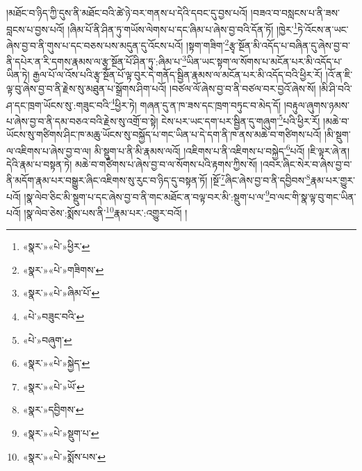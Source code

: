 །མཐོང་བ་ཉིད་ཀྱི་དུས་ནི་མཐོང་བའི་ཚེ་ཉེ་བར་གནས་པ་དེའི་དབང་དུ་བྱས་པའོ། །བཟའ་བ་བསླངས་པ་ནི་ཟས་བླངས་པ་བྱས་པའོ། །ཞིམ་པོ་ནི་ཤིན་ཏུ་གཡོས་ལེགས་པ་དང་ཞིམ་པ་ཞེས་བྱ་བའི་དོན་ཏོ། །ཁྱེར་\footnote{«སྣར་»«པེ་»ཕྱིར་}ཏེ་འོངས་ན་ཡང་ཞེས་བྱ་བ་ནི་གུས་པ་དང་བཅས་པས་མདུན་དུ་འོངས་པའོ། །སྟག་གཟིག་\footnote{«སྣར་»«པེ་»གཟིགས་}རྩྭ་སྔོན་མི་འདོད་པ་བཞིན་དུ་ཞེས་བྱ་བ་ནི་དཔེར་ན་རི་དགས་རྣམས་ལ་རྩྭ་སྔོན་པོ་ཤིན་ཏུ་:ཞིམ་པ་\footnote{«སྣར་»«པེ་»ཞིམ་པོ་}ཡིན་ཡང་སྟག་ལ་སོགས་པ་མངོན་པར་མི་འདོད་པ་ཡིན་ཏེ། རྒྱལ་པོ་ལ་འོས་པའི་རྩྭ་སྔོན་པོ་ལྟ་བུར་དེ་གནོད་སྦྱིན་རྣམས་ལ་མངོན་པར་མི་འདོད་བའི་ཕྱིར་རོ། །འོ་ན་ཇི་ལྟ་བུ་ཞེས་བྱ་བ་ནི་རྗེས་སུ་མཐུན་པ་སྒྲོགས་ཤིག་པའོ། །བཙལ་ལོ་ཞེས་བྱ་བ་ནི་བཙལ་བར་བྱའོ་ཞེས་སོ། །མི་ཤི་བའི་ཤ་དང་ཁྲག་ཡོངས་སུ་:གཟུང་བའི་\footnote{«པེ་»བཟུང་བའི་}ཕྱིར་ཏེ། གཞན་དུ་ན་ཁ་ཟས་དང་ཁྲག་བཏུང་བ་མེད་དོ། །བརྟུལ་ཞུགས་ཉམས་པ་ཞེས་བྱ་བ་ནི་དམ་བཅའ་བའི་རྗེས་སུ་འགྲོ་བ་སྟེ། ངེས་པར་ཡང་དག་པར་སྦྱིན་དུ་གཞུག་\footnote{«པེ་»བཞུག་}པའི་ཕྱིར་རོ། །མཆེ་བ་ཡོངས་སུ་གཙིགས་ཤིང་ཁ་མཆུ་ཡོངས་སུ་བསྐྱོད་པ་གང་ཡིན་པ་དེ་དག་ནི་ཁ་ནས་མཆེ་བ་གཙིགས་པའོ། །མི་སྡུག་ལ་འཇིགས་པ་ཞེས་བྱ་བ་ལ། མི་སྡུག་པ་ནི་མི་རྣམས་ལའོ། །འཇིགས་པ་ནི་འཇིགས་པ་བསྐྱེད་\footnote{«སྣར་»«པེ་»སྐྱེད་}པའོ། །ཇི་ལྟར་ཞེ་ན། དེའི་རྣམ་པ་བསྟན་ཏེ། མཆེ་བ་གཙིགས་པ་ཞེས་བྱ་བ་ལ་སོགས་པའི་རྟགས་ཀྱིས་སོ། །འབར་ཞིང་སེར་བ་ཞེས་བྱ་བ་ནི་མདོག་རྣམ་པར་བསྒྱུར་ཞིང་འཇིགས་སུ་རུང་བ་ཉིད་དུ་བསྟན་ཏོ། །སྔོ་\footnote{«སྣར་»«པེ་»ཡོ་}ཞིང་ཞེས་བྱ་བ་ནི་དབྱིབས་\footnote{«སྣར་»དབྱིགས་}རྣམ་པར་གྱུར་པའོ། །སྣ་ལེབ་ཅིང་མི་སྡུག་པ་དང་ཞེས་བྱ་བ་ནི་གང་མཐོང་ན་བལྟ་བར་མི་:སྡུག་པ་ལ་\footnote{«སྣར་»«པེ་»སྡུག་པ་}བ་ལང་གི་སྣ་ལྟ་བུ་གང་ཡིན་པའོ། །སྣ་ལེབ་ཅེས་:སྨོས་པས་ནི་\footnote{«སྣར་»«པེ་»སྨོས་པས་}རྣམ་པར་:འགྱུར་བའོ། །
